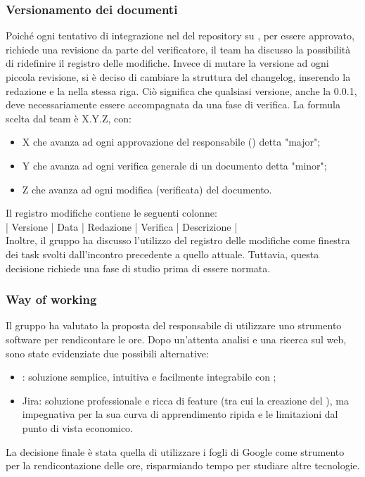 \subsubsection{Versionamento dei documenti} \label{sec:versionamento}
Poiché ogni tentativo di integrazione nel  del repository su , per essere approvato, richiede una revisione da parte del verificatore, il team ha discusso la possibilità di ridefinire il registro delle modifiche. Invece di mutare la versione ad ogni piccola revisione, si è deciso di cambiare la struttura del changelog, inserendo la redazione e la  nella stessa riga. Ciò significa che qualsiasi versione, anche la 0.0.1, deve necessariamente essere accompagnata da una fase di verifica. La formula scelta dal team è X.Y.Z, con:
\begin{itemize}
	\item X che avanza ad ogni approvazione del responsabile () detta "major";
	\item Y che avanza ad ogni verifica generale di un documento detta "minor";
	\item Z che avanza ad ogni modifica (verificata) del documento.
\end{itemize}

\vspace{0.5\baselineskip}
Il registro modifiche contiene le seguenti colonne: \\
\vspace{\baselineskip}
\hspace{1cm} | Versione | Data | Redazione | Verifica | Descrizione | \\
Inoltre, il gruppo ha discusso l'utilizzo del registro delle modifiche come finestra dei task svolti dall'incontro precedente a quello attuale. Tuttavia, questa decisione richiede una fase di studio prima di essere normata.

\subsubsection{Way of working}
Il gruppo ha valutato la proposta del responsabile di utilizzare uno strumento software per rendicontare le ore. Dopo un'attenta analisi e una ricerca sul web, sono state evidenziate due possibili alternative:
\begin{itemize}
	\item {}: soluzione semplice, intuitiva e facilmente integrabile con ;
	\item Jira: soluzione professionale e ricca di feature (tra cui la creazione del ), ma impegnativa per la sua curva di apprendimento ripida e le limitazioni dal punto di vista economico.
\end{itemize}
La decisione finale è stata quella di utilizzare i fogli di Google come strumento per la rendicontazione delle ore, risparmiando tempo per studiare altre tecnologie. 

